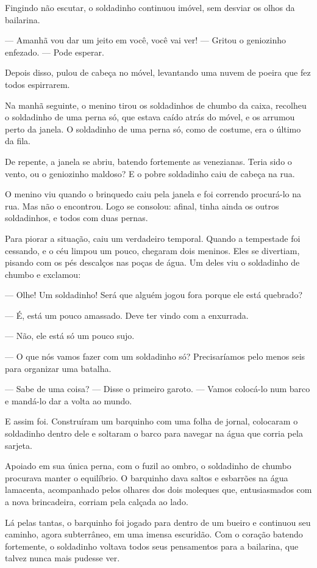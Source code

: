 \begin{myquote}
Fingindo não escutar, o soldadinho continuou imóvel, sem desviar os
olhos da bailarina.

--- Amanhã vou dar um jeito em você, você vai ver! --- Gritou o geniozinho
enfezado. --- Pode esperar.

Depois disso, pulou de cabeça no móvel, levantando uma nuvem de poeira que fez todos espirrarem.

Na manhã seguinte, o menino tirou os soldadinhos de chumbo da caixa,
recolheu o soldadinho de uma perna só, que estava caído atrás do móvel, e
os arrumou perto da janela. O soldadinho de uma perna só, como de
costume, era o último da fila.

De repente, a janela se abriu, batendo fortemente as venezianas. Teria
sido o vento, ou o geniozinho maldoso? E o pobre soldadinho caiu de
cabeça na rua.

O menino viu quando o brinquedo caiu pela janela e foi correndo
procurá-lo na rua. Mas não o encontrou. Logo se consolou: afinal, tinha
ainda os outros soldadinhos, e todos com duas pernas.

Para piorar a situação, caiu um verdadeiro temporal. Quando a tempestade
foi cessando, e o céu limpou um pouco, chegaram dois meninos. Eles se
divertiam, pisando com os pés descalços nas poças de água. Um deles viu
o soldadinho de chumbo e exclamou:

--- Olhe! Um soldadinho! Será que alguém jogou fora porque ele está
quebrado?

--- É, está um pouco amassado. Deve ter vindo com a enxurrada.

--- Não, ele está só um pouco sujo.

--- O que nós vamos fazer com um soldadinho só? Precisaríamos pelo menos
seis para organizar uma batalha.

--- Sabe de uma coisa? --- Disse o primeiro garoto. --- Vamos colocá-lo
num barco e mandá-lo dar a volta ao mundo.

E assim foi. Construíram um barquinho com uma folha de jornal, colocaram
o soldadinho dentro dele e soltaram o barco para navegar na água que
corria pela sarjeta.

Apoiado em sua única perna, com o fuzil ao ombro, o soldadinho de chumbo
procurava manter o equilíbrio. O barquinho dava saltos e esbarrões na
água lamacenta, acompanhado pelos olhares dos dois moleques que,
entusiasmados com a nova brincadeira, corriam pela calçada ao lado.

Lá pelas tantas, o barquinho foi jogado para dentro de um bueiro e
continuou seu caminho, agora subterrâneo, em uma imensa escuridão. Com o
coração batendo fortemente, o soldadinho voltava todos seus pensamentos
para a bailarina, que talvez nunca mais pudesse ver.


\end{myquote}
